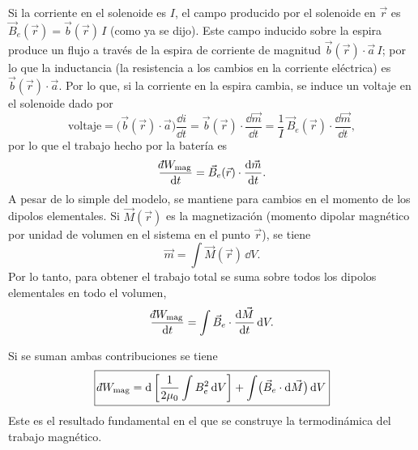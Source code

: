 \begin{enumerate}[label=\alph*),itemsep=2pt]
    Si la corriente en el solenoide es $I$, el campo producido por el solenoide en $\vec{r}$ es
    $\vec{B}_e(\vec{r})=\vec{b}(\vec{r})\,I$ (como ya se dijo). Este campo inducido sobre la espira
    produce un flujo a través de la espira de corriente de magnitud $\vec{b}(\vec{r})\cdot\vec{a}\,I$;
    por lo que la inductancia (la resistencia a los cambios en la corriente eléctrica) es
    $\vec{b}(\vec{r})\cdot\vec{a}$. Por lo que, si la corriente en la espira cambia, se induce un
    voltaje en el solenoide dado por
    \begin{equation*}
      \text{voltaje}=\bigl(\vec{b}(\vec{r})\cdot\vec{a}\bigr)\frac{\dd i}{\dd t}
      =\vec{b}(\vec{r})\cdot\frac{\dd\vec{m}}{\dd t}
      =\frac{1}{I}\,\vec{B}_e(\vec{r})\cdot\frac{\dd\vec{m}}{\dd t},
    \end{equation*}
    por lo que el trabajo hecho por la batería es
    \begin{equation*}
      \frac{\dbar W_{\mathrm{mag}}}{\dd t}=\vec{B}_e(\vec{r})\cdot\frac{\dd\vec{m}}{\dd t}.
    \end{equation*}
    A pesar de lo simple del modelo, se mantiene para cambios en el momento de los dipolos
    elementales. Si $\vec{M}(\vec{r})$ es la magnetización (momento dipolar magnético por unidad de
    volumen en el sistema en el punto $\vec{r}$), se tiene
    \begin{equation*}
      \vec{m}=\int\vec{M}(\vec{r})\,\dd V.
    \end{equation*}
    Por lo tanto, para obtener el trabajo total se suma sobre todos los dipolos elementales en todo
    el volumen,
    \begin{equation*}
      \frac{\dbar W_{\mathrm{mag}}}{\dd t}=\int\vec{B}_e\cdot\frac{\dd\vec{M}}{\dd t}\,\dd V.
    \end{equation*}
\end{enumerate}
Si se suman ambas contribuciones se tiene
\begin{equation*}
  \boxed{\dbar W_{\mathrm{mag}}=\dd\left[\frac{1}{2\mu_0}\int B_e^{2}\,\dd V\right]+\int\bigl(\vec{B}_e\cdot\dd\vec{M}\bigr)\,\dd V}
\end{equation*}
Este es el resultado fundamental en el que se construye la termodinámica del trabajo magnético.

